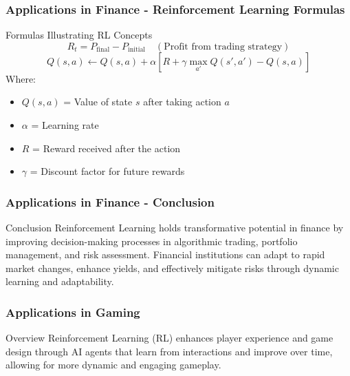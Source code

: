 \documentclass{beamer}
\begin{document}
\begin{frame}[fragile]
    \frametitle{Applications in Finance - Reinforcement Learning Formulas}
    \begin{block}{Formulas Illustrating RL Concepts}
        \begin{equation}
            R_t = P_{\text{final}} - P_{\text{initial}}  \quad (\text{Profit from trading strategy})
        \end{equation}
        \begin{equation}
            Q(s, a) \leftarrow Q(s, a) + \alpha [R + \gamma \max_{a'} Q(s', a') - Q(s, a)]
        \end{equation}
        Where:
        \begin{itemize}
            \item $Q(s, a)$ = Value of state $s$ after taking action $a$
            \item $\alpha$ = Learning rate
            \item $R$ = Reward received after the action
            \item $\gamma$ = Discount factor for future rewards
        \end{itemize}
    \end{block}
\end{frame}

\begin{frame}[fragile]
    \frametitle{Applications in Finance - Conclusion}
    \begin{block}{Conclusion}
        Reinforcement Learning holds transformative potential in finance by improving decision-making processes in 
        algorithmic trading, portfolio management, and risk assessment. Financial institutions can adapt to rapid 
        market changes, enhance yields, and effectively mitigate risks through dynamic learning and adaptability.
    \end{block}
\end{frame}

\begin{frame}
    \frametitle{Applications in Gaming}
    \begin{block}{Overview}
        Reinforcement Learning (RL) enhances player experience and game design through AI agents that learn from interactions and improve over time, allowing for more dynamic and engaging gameplay.
    \end{block}
\end{frame}
\end{document}

